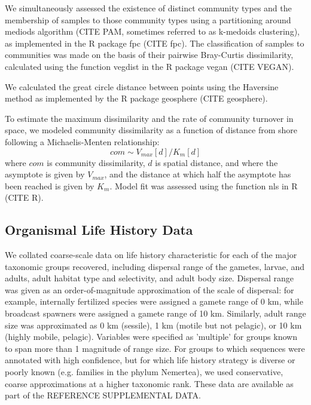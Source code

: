 \documentclass[11pt,letterpaper]{article} %
\begin{document}
We simultaneously assessed the existence of distinct community types and the membership of samples to those community types using a partitioning around mediods algorithm (CITE PAM, sometimes referred to as k-medoids clustering), as implemented in the R package fpc (CITE fpc).
The classification of samples to communities was made on the basis of their pairwise Bray-Curtis dissimilarity, calculated using the function vegdist in the R package vegan (CITE VEGAN). %

We calculated the great circle distance between points using the Haversine method as implemented by the R package geosphere (CITE geosphere).

To estimate the maximum dissimilarity and the rate of community turnover in space, we modeled community dissimilarity as a function of distance from shore following a Michaelis-Menten relationship:
\begin{equation}\label{MichaelisMenten}
	com \sim V_{max}[d]/K_{m}[d]
\end{equation}
where $com$ is community dissimilarity, $d$ is spatial distance, and where the asymptote is given by $V_{max}$, and the distance at which half the asymptote has been reached is given by $K_{m}$.
Model fit was assessed using the function nls in R (CITE R).


\subsection*{Organismal Life History Data}
We collated coarse-scale data on life history characteristic for each of the major taxonomic groups recovered,
including dispersal range of the gametes, larvae, and adults, adult habitat type and selectivity, and adult body size.
Dispersal range was given as an order-of-magnitude approximation of the scale of dispersal: for example, internally fertilized species were assigned a gamete range of 0 km, while broadcast spawners were assigned a gamete range of 10 km.
Similarly, adult range size was approximated as 0 km (sessile), 1 km (motile but not pelagic), or 10 km (highly mobile, pelagic).
Variables were specified as 'multiple' for groups known to span more than 1 magnitude of range size.
For groups to which sequences were annotated with high confidence, but for which life history strategy is diverse or poorly known (e.g. families in the phylum Nemertea), we used conservative, coarse approximations at a higher taxonomic rank.
These data are available as part of the REFERENCE SUPPLEMENTAL DATA.
\end{document}
